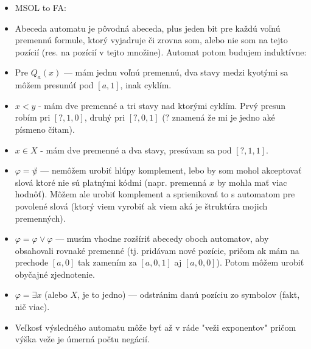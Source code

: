 \documentclass[paper=a4, fontsize=11pt]{scrartcl} %
\numberwithin{equation}{section} %
\numberwithin{figure}{section} %
\numberwithin{table}{section} %
\begin{document}
\begin{itemize}
\begin{itemize}
			\item MSOL to FA:
			\item Abeceda automatu je pôvodná abeceda, plus jeden bit pre každú voľnú premennú formule, ktorý vyjadruje či zrovna som, alebo nie som na tejto pozícií (res. na pozícií v tejto množine). Automat potom budujem induktívne:
			\item Pre $Q_a(x)$ — mám jednu voľnú premennú, dva stavy medzi kyotými sa môžem presunúť pod $[a, 1]$, inak cyklím.
			\item $x < y$ - mám dve premenné a tri stavy nad ktorými cyklím. Prvý presun robím pri $[?, 1, 0]$, druhý pri $[?, 0, 1]$ ($?$ znamená že mi je jedno aké písmeno čítam).
			\item $x \in X$ - mám dve premenné a dva stavy, presúvam sa pod $[?, 1, 1]$.
			\item $\varphi = \not \psi$ — nemôžem urobiť hlúpy komplement, lebo by som mohol akceptovať slová ktoré nie sú platnými kódmi (napr. premenná $x$ by mohla mať viac hodnôť). Môžem ale urobiť komplement a sprienikovať to s automatom pre povolené slová (ktorý viem vyrobiť ak viem aká je štruktúra mojich premenných).
			\item $\varphi = \varphi \lor \varphi$ — musím vhodne rozšíriť abecedy oboch automatov, aby obsahovali rovnaké premenné (tj. pridávam nové pozície, pričom ak mám na prechode $[a, 0]$ tak zamením za $[a, 0, 1]$ aj $[a, 0, 0]$). Potom môžem urobiť obyčajné zjednotenie.
			\item $\varphi = \exists x$ (alebo $X$, je to jedno) — odstránim danú pozíciu zo symbolov (fakt, nič viac).
			\item Veľkosť výsledného automatu môže byť až v ráde "veži exponentov" pričom výška veže je úmerná počtu negácií.
		\end{itemize}
	
	\end{itemize}
\end{document}
